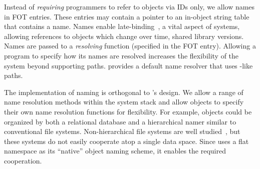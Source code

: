 Instead of \emph{requiring} programmers to refer to objects via IDs only, we allow
names in FOT entries. These entries may contain a pointer to an
in-object string table that contains a name.
Names enable late-binding~\cite{daley:cacm68}, a
vital aspect of systems, allowing references to objects which change over time, \eg shared library versions.
Names are passed to a \textit{resolving} function (specified in the FOT entry).
Allowing a program to specify how its names are resolved
increases the flexibility of the system beyond supporting \unix paths. \Twizzler
provides a default name resolver that uses \unix-like paths.%

The implementation of naming is orthogonal to \Twizzler's design. We
allow a range of name resolution methods within the system stack
and allow objects to specify their own name resolution functions for flexibility. For example,
objects could be organized by both a relational database and a hierarchical namer
similar to conventional file systems. Non-hierarchical file systems
are well studied~\cite{gifford:sosp91, ames:mss06, padioleau:usenix03, gopal:osdi99,
    parkerwood:systor14}, but these systems do not easily cooperate atop a single data space.
Since \Twizzler uses a flat namespace as its ``native'' object naming scheme, it
enables the required cooperation.


